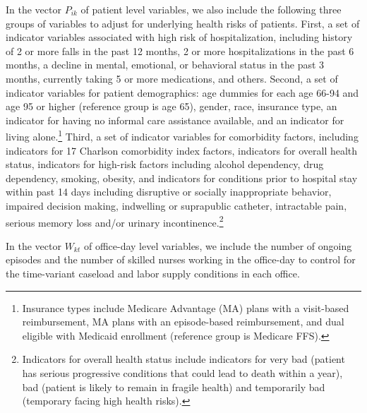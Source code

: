 \documentclass[final,12pt, notitlepage]{article}
\begin{document}
In the vector $P_{ik}$ of patient level variables, we also include the following three groups of variables to adjust for underlying health risks of patients. First, a set of indicator variables associated with high risk of hospitalization, including history of 2 or more falls in the past 12 months, 2 or more hospitalizations in the past 6 months, a decline in mental, emotional, or behavioral status in the past 3 months, currently taking 5 or more medications, and others.
Second, a set of indicator variables for patient demographics: age dummies for each age 66-94 and age 95 or higher (reference group is age 65), gender, race, insurance type, an indicator for having no informal care assistance available, and an indicator for living alone.\footnote{Insurance types include Medicare Advantage (MA) plans with a visit-based reimbursement, MA plans with an episode-based reimbursement, and dual eligible with Medicaid enrollment (reference group is Medicare FFS).
}
Third, a set of indicator variables for comorbidity factors, including indicators for 17 Charlson comorbidity index factors, indicators for overall health status, indicators for high-risk factors including alcohol dependency, drug dependency, smoking, obesity, and indicators for conditions prior to hospital stay within past 14 days including disruptive or socially inappropriate behavior, impaired decision making, indwelling or suprapublic catheter, intractable pain, serious memory loss and/or urinary incontinence.\footnote{Indicators for overall health status include indicators for very bad (patient has serious progressive conditions that could lead to death within a year), bad (patient is likely to remain in fragile health) and temporarily bad (temporary facing high health risks).
}

In the vector $W_{kt}$ of office-day level variables, we include the number of ongoing episodes and the number of skilled nurses working in the office-day to control for the time-variant caseload and labor supply conditions in each office.
\end{document}
